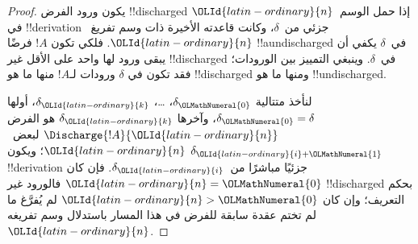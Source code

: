 \documentclass[../../../include/open-logic-section]{subfiles}
\begin{document}
\begin{proof}
  يكون ورود الفرض !!{discharged} إذا
  حمل الوسم~${\OLId{latin-ordinary}{n}}$ في !!{derivation}
  جزئي من~$\delta$، وكانت قاعدته
  الأخيرة ذات وسم تفريغ~${\OLId{latin-ordinary}{n}}$.
  فلكي تكون $!A$ فرضًا !!a{undischarged}
  في~$\delta$ يكفي أن يبقى ورود لها
  واحد على الأقل غير !!{discharged}
  في~$\delta$. وينبغي التمييز بين
  الورودات؛ فقد تكون في $\delta$
  ورودات لـ$!A$ منها ما هو
  !!{discharged} ومنها ما هو !!{undischarged}.

  لنأخذ متتالية $\delta_{\OLMathNumeral{0}}$، \dots،
  $\delta_{\OLId{latin-ordinary}{k}}$، أولها $\delta_{\OLMathNumeral{0}}=\delta$،
  وآخرها $\delta_{\OLId{latin-ordinary}{k}}$ هو الفرض
  $\Discharge{!A}{{\OLId{latin-ordinary}{n}}}$ لبعض~${\OLId{latin-ordinary}{n}}$؛
  ويكون $\delta_{{\OLId{latin-ordinary}{i}}+{\OLMathNumeral{1}}}$ !!{derivation}
  جزئيًا مباشرًا من~$\delta_{\OLId{latin-ordinary}{i}}$.
  فإن كان ${\OLId{latin-ordinary}{n}}={\OLMathNumeral{0}}$ فالورود غير !!{discharged}
  بحكم التعريف؛ وإن كان ${\OLId{latin-ordinary}{n}}>{\OLMathNumeral{0}}$ لم يُفرَّغ
  ما لم تختم عقدة سابقة للفرض في هذا
  المسار باستدلال وسم تفريغه~${\OLId{latin-ordinary}{n}}$.


\end{proof}
\end{document}

